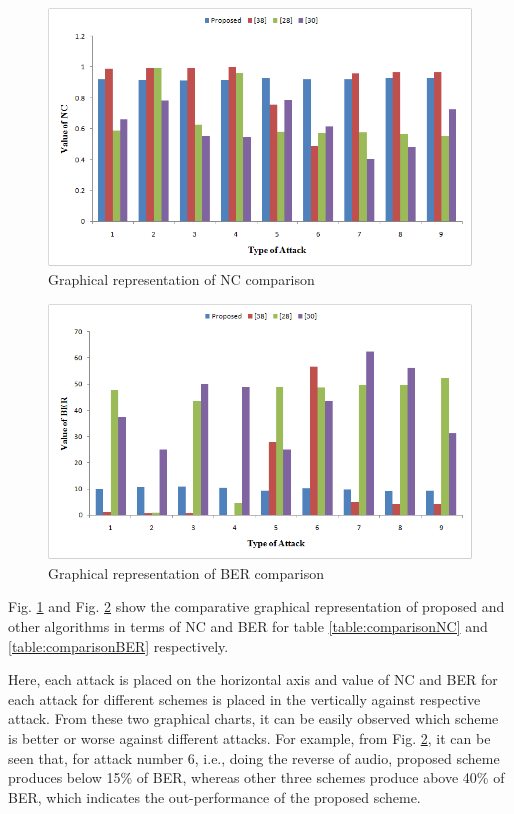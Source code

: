 \documentclass[12pt,a4paper]{report}
\begin{document}
\begin{figure}[h!]
\centering
\includegraphics[scale=.7]{image/NC.png}
\caption{Graphical representation of NC comparison}
\label{fig:NC}
\end{figure}

\begin{figure}[h!]
\centering
\includegraphics[scale=.7]{image/BER.png}
\caption{Graphical representation of BER comparison}
\label{fig:ber}
\end{figure}

Fig. \ref{fig:NC} and Fig. \ref{fig:ber} show the comparative graphical representation of proposed and other algorithms in terms of NC and BER for table \ref{table:comparisonNC} and \ref{table:comparisonBER} respectively.

\bigskip

Here, each attack is placed on the horizontal axis and value of NC and BER for each attack for different schemes is placed in the vertically against respective attack. From these two graphical charts, it can be easily observed which scheme is better or worse against different attacks. For example, from Fig. \ref{fig:ber}, it can be seen that, for attack number 6, i.e., doing the reverse of audio, proposed scheme produces below 15\% of BER, whereas other three schemes produce above 40\% of BER, which indicates the out-performance of the proposed scheme.
\end{document}

